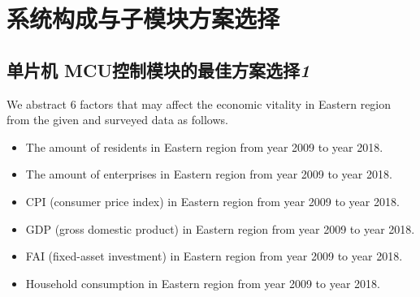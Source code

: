 \documentclass{apmcmthesis}
\begin{document}
\section{系统构成与子模块方案选择}
\subsection{单片机 MCU控制模块的最佳方案选择\textit 1}
\hspace{2em}We abstract 6 factors that may affect the economic vitality in Eastern region from the given and surveyed data as follows.
\begin{itemize}
\item The amount of residents in Eastern region from year 2009 to year 2018.
\item The amount of enterprises in Eastern region from year 2009 to year 2018.
\item CPI (consumer price index) in Eastern region from year 2009 to year 2018. 
\item GDP (gross domestic product) in Eastern region from year 2009 to year 2018.
\item FAI (fixed-asset investment) in Eastern region from year 2009 to year 2018.
\item Household consumption in Eastern region from year 2009 to year 2018.
\end{itemize}
\end{document}
